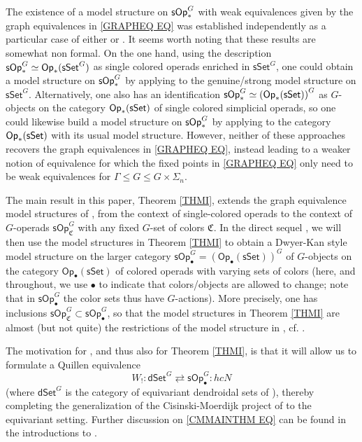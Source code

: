 \documentclass[a4paper,10pt
,draft
]{article}%
\numberwithin{equation}{section}
\numberwithin{figure}{section}
\theoremstyle{definition} %
\newcommand{\sSet}{\ensuremath{\mathsf{sSet}}}%
\newcommand{\Op}{\mathsf{Op}}%
\newcommand{\sOp}{\ensuremath{\mathsf{sOp}}}%
\newcommand{\1}{\ensuremath{\mathbbm 1}}%
\begin{document}
The existence of a model structure 
on $\mathsf{sOp}^G_{\**}$
with weak equivalences given by the graph equivalences
in \eqref{GRAPHEQ EQ}
was established independently as a particular case of either
\cite[Thm. I]{BP_geo} or \cite[Thm. 3.1]{GW18}.
It seems worth noting that these results are somewhat non formal.
On the one hand, using the description 
$\mathsf{sOp}_{\**}^G \simeq \mathsf{Op}_{\**}(\mathsf{sSet}^G)$
as single colored operads enriched in 
$\mathsf{sSet}^G$,
one could obtain a model structure
on $\mathsf{sOp}_{\**}^G$
by applying \cite[Thm. 3.2]{BM03}
to the genuine/strong model structure on $\mathsf{sSet}^G$.
Alternatively, one also has an identification
$\mathsf{sOp}_{\**}^G \simeq 
\left(\mathsf{Op}_{\**}(\mathsf{sSet})\right)^G$
as $G$-objects on the category
$\mathsf{Op}_{\**}(\mathsf{sSet})$
of single colored simplicial operads,
so one could likewise build a model structure on 
$\mathsf{sOp}_{\**}^G$
by applying \cite[Prop. 2.6]{Ste16}
to the category
$\mathsf{Op}_{\**}(\mathsf{sSet})$
with its usual model structure.
However, neither of these approaches
recovers the graph equivalences in \eqref{GRAPHEQ EQ},
instead leading to a weaker notion of equivalence for which the fixed points in \eqref{GRAPHEQ EQ}
only need to be weak equivalences for
$\Gamma \leq G \leq G \times \Sigma_n$.


The main result in this paper, 
Theorem \ref{THMI}, %
extends the graph equivalence model structures of
\cite[Thm. I]{BP_geo}, \cite[Thm. 3.1]{GW18}
from the context of single-colored operads 
to the context of $G$-operads
$\sOp^G_{\mathfrak C}$
with any fixed $G$-set of colors $\mathfrak{C}$.
In the direct sequel \cite{BP_ACOP},
we will then use the model structures in 
Theorem \ref{THMI} to obtain a Dwyer-Kan style model structure
\cite[Thm. \ref{AC-THMA}]{BP_ACOP}
on the larger category
$\sOp^G_\bullet = \left(\Op_\bullet(\sSet)\right)^G$
of $G$-objects on the category $\Op_\bullet(\sSet)$
of colored operads with varying sets of colors
(here, and throughout, we use $\bullet$ to indicate that colors/objects are allowed to change;
note that in $\sOp^G_\bullet$ the color sets
thus have $G$-actions).
%
More precisely, one has inclusions
$\sOp^G_{\mathfrak C} \subset \sOp^G_\bullet$,
so that the model structures in Theorem \ref{THMI}
are almost (but not quite)
the restrictions of the model structure in 
\cite[Thm. \ref{AC-THMA}]{BP_ACOP},
cf. \cite[Prop. \ref{AC-FIBERGLMOD PROP}]{BP_ACOP}.



The motivation for 
\cite[Thm. \ref{AC-THMA}]{BP_ACOP},
and thus also for Theorem \ref{THMI},
is that it will allow us to formulate 
a Quillen equivalence \cite{BP_TAS}
\begin{equation}\label{CMMAINTHM EQ}
W_!\colon \mathsf{dSet}^G \rightleftarrows \mathsf{sOp}_{\bullet}^G \colon hcN
\end{equation}
(where $\mathsf{dSet}^G$
is the category of equivariant dendroidal sets
of \cite{Per18}), thereby completing the 
generalization of the Cisinski-Moerdijk project of \cite{CM11,CM13a,CM13b} to the equivariant setting.
Further discussion on \eqref{CMMAINTHM EQ} can be found in the introductions to \cite{BP_ACOP,BP_TAS}.
\end{document}
